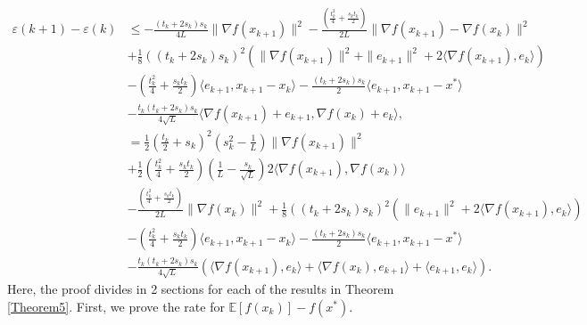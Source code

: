 \documentclass{article}
\theoremstyle{plain}
\theoremstyle{definition}
\theoremstyle{remark}
\begin{document}
        \begin{align}\label{Lyap_stc_6}
            \varepsilon(k+1)-\varepsilon(k)&\leq -\frac{(t_k+2s_k)s_k}{4L} \|\nabla f(x_{k+1})\|^2-\frac{(\frac{t_{k}^2}{4}+\frac{s_{k}t_{k}}{2})}{2L}\|\nabla f(x_{k+1})-\nabla f(x_k)\|^2\nonumber\\
            &+\frac{1}{8}((t_k+2s_k)s_k)^2(\|\nabla f(x_{k+1})\|^2+\|e_{k+1}\|^2+2\langle \nabla f(x_{k+1}) ,e_k \rangle) \nonumber\\
            & -(\frac{t_k^2}{4}+\frac{s_kt_k}{2})\langle e_{k+1},x_{k+1}-x_k\rangle-\frac{(t_k+2s_k)s_k}{2}\langle e_{k+1},x_{k+1}-x^*\rangle\nonumber\\
         & -\frac{t_k(t_k+2s_k)s_k}{4\sqrt{L}}\langle \nabla f(x_{k+1})+e_{k+1}, \nabla f(x_k)+e_k \rangle,\nonumber\\
         &=\frac{1}{2}\left(\frac{t_k}{2}+s_k\right)^2(s_k^2-\frac{1}{L})\|\nabla f(x_{k+1})\|^2\nonumber\\
         &+\frac{1}{2}\left(\frac{t_k^2}{4}+\frac{s_kt_k}{2} \right)(\frac{1}{L}-\frac{s_k}{\sqrt{L}}) 2\langle \nabla f(x_{k+1}),\nabla f(x_k) \rangle\nonumber\\
         &-\frac{(\frac{t_{k}^2}{4}+\frac{s_{k}t_{k}}{2})}{2L}\|\nabla f(x_k)\|^2+\frac{1}{8}((t_k+2s_k)s_k)^2(\|e_{k+1}\|^2+2\langle \nabla f(x_{k+1}) ,e_k \rangle)\nonumber\\
         & -(\frac{t_k^2}{4}+\frac{s_kt_k}{2})\langle e_{k+1},x_{k+1}-x_k\rangle-\frac{(t_k+2s_k)s_k}{2}\langle e_{k+1},x_{k+1}-x^*\rangle\nonumber\\
         &-\frac{t_k(t_k+2s_k)s_k}{4\sqrt{L}}\left(\langle \nabla f(x_{k+1}),e_k \rangle+\langle \nabla f(x_{k}) , e_{k+1}\rangle+\langle e_{k+1},e_k\rangle\right).
        \end{align}
        Here, the proof divides in 2 sections for each of the results in Theorem \ref{Theorem5}. First, we prove the rate for $\mathbb E\left[f(x_k)\right]-f(x^*)$. 
        
\end{document}
